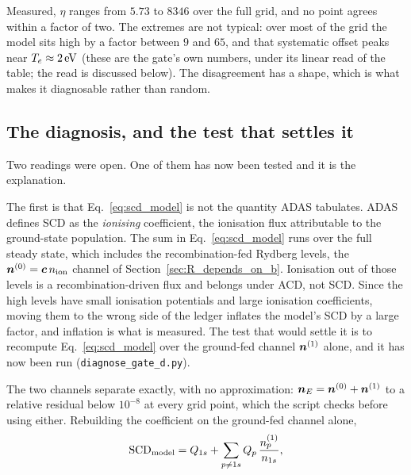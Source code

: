 Measured, $\eta$ ranges from $5.73$ to $8346$ over the full grid, and no point
agrees within a factor of two. The extremes are not typical: over most of the
grid the model sits high by a factor between $9$ and $65$, and that systematic
offset peaks near $T_e \approx \SI{2}{\electronvolt}$ (these are the gate's
own numbers, under its linear read of the table; the read is discussed
below). The disagreement has a
shape, which is what makes it diagnosable rather than random.

\subsection{The diagnosis, and the test that settles it}
\label{sec:gate_d_diagnosis}

Two readings were open. One of them has now been tested and it is the
explanation.

The first is that Eq.~\eqref{eq:scd_model} is not the quantity ADAS tabulates.
ADAS defines SCD as the \emph{ionising} coefficient, the ionisation flux
attributable to the ground-state population. The sum in
Eq.~\eqref{eq:scd_model} runs over the full steady state, which includes the
recombination-fed Rydberg levels, the $\bm{n}^{(0)} = \bm{c}\,n_{\mathrm{ion}}$ channel of
Section~\ref{sec:R_depends_on_b}. Ionisation out of
those levels is a recombination-driven flux and belongs under ACD, not SCD.
Since the high levels have small ionisation potentials and large ionisation
coefficients, moving them to the wrong side of the ledger inflates the model's
SCD by a large factor, and inflation is what is measured. The test that would
settle it is to recompute Eq.~\eqref{eq:scd_model} over the ground-fed channel
$\bm{n}^{(1)}$ alone, and it has now been run
(\texttt{diagnose\_gate\_d.py}).

The two channels separate exactly, with no approximation:
$\bm{n}_E = \bm{n}^{(0)} + \bm{n}^{(1)}$ to a relative residual below $10^{-8}$ at every grid
point, which the script checks before using either. Rebuilding the coefficient
on the ground-fed channel alone,
\begin{equation}
  {\rm SCD}_{\rm model} = Q_{1s}
  + \sum_{p \neq 1s} Q_p\,\frac{n^{(1)}_p}{n_{1s}},
  \label{eq:scd_groundfed}
\end{equation}

